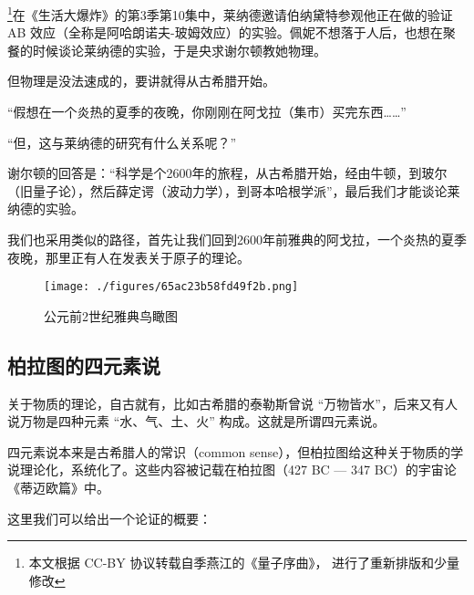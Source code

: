 
\footnote{本文根据 CC-BY 协议转载自季燕江的《量子序曲》， 进行了重新排版和少量修改}在《生活大爆炸》的第3季第10集中，莱纳德邀请伯纳黛特参观他正在做的验证 AB 效应（全称是阿哈朗诺夫-玻姆效应）的实验。佩妮不想落于人后，也想在聚餐的时候谈论莱纳德的实验，于是央求谢尔顿教她物理。

但物理是没法速成的，要讲就得从古希腊开始。

“假想在一个炎热的夏季的夜晚，你刚刚在阿戈拉（集市）买完东西……”

“但，这与莱纳德的研究有什么关系呢？”

谢尔顿的回答是：“科学是个2600年的旅程，从古希腊开始，经由牛顿，到玻尔（旧量子论），然后薛定谔（波动力学），到哥本哈根学派”，最后我们才能谈论莱纳德的实验。

我们也采用类似的路径，首先让我们回到2600年前雅典的阿戈拉，一个炎热的夏季夜晚，那里正有人在发表关于原子的理论。

\begin{figure}[ht]
\centering
\texttt{[image: ./figures/65ac23b58fd49f2b.png]}
\caption{公元前2世纪雅典鸟瞰图} \label{fig_AtomId_1}
\end{figure}

\subsection{柏拉图的四元素说}

关于物质的理论，自古就有，比如古希腊的泰勒斯曾说 “万物皆水”，后来又有人说万物是四种元素 “水、气、土、火” 构成。这就是所谓四元素说。

四元素说本来是古希腊人的常识（common sense），但柏拉图给这种关于物质的学说理论化，系统化了。这些内容被记载在柏拉图（427 BC — 347 BC）的宇宙论《蒂迈欧篇》中。

这里我们可以给出一个论证的概要：

